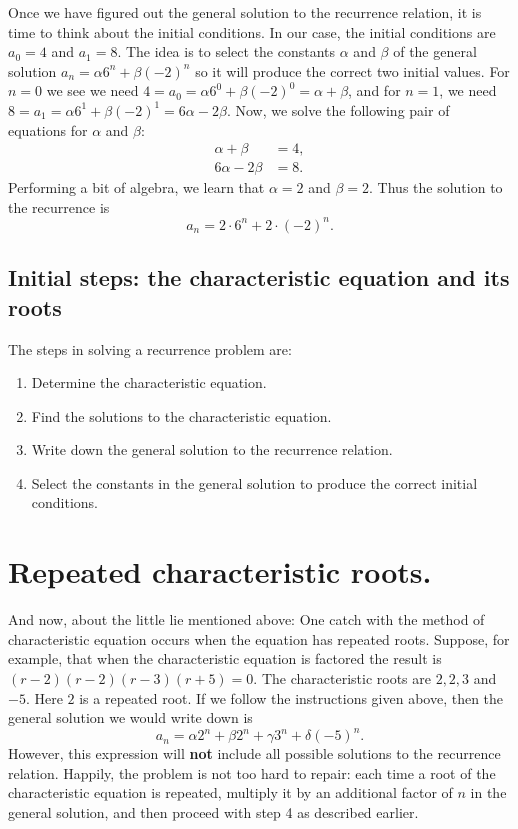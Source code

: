 Once we have figured out the general solution to the recurrence
relation, it is time to think about the initial conditions.  In our
case, the initial conditions are $a_0=4$  and $a_1=8$.  The idea is to
select the constants $\alpha$ and $\beta$ of the general solution
$a_n=\alpha 6^n+\beta (-2)^n$ so it will produce the correct two initial values.
For $n=0$ we see we need $4=a_0=\alpha 6^0+\beta (-2)^0 = \alpha+\beta$, and for
$n=1$, we need $8=a_1=\alpha 6^1+\beta (-2)^1 = 6\alpha-2\beta$. Now, we solve the 
following pair of equations for $\alpha$ and $\beta$:
\begin{align*}
  \alpha +  \beta &=4, \\
 6\alpha - 2\beta &=8.
\end{align*}
Performing a bit of algebra, we learn that $\alpha=2$ and
$\beta=2$.  Thus the solution to the recurrence is
\[
a_n=2\cdot6^n+2\cdot(-2)^n.
\]

\subsection{Initial steps: the characteristic equation and its roots}
The steps in solving a recurrence problem are:
\begin{enumerate}
 \item Determine the characteristic equation.
 \item Find the solutions to the characteristic equation.
 \item Write down the general solution to the recurrence relation.
 \item Select the constants in the general solution to produce the correct
 initial conditions.
\end{enumerate}


\section{Repeated characteristic roots.}\label{sect:repeated roots}
And now, about the little lie mentioned above: One catch with the method of
characteristic equation occurs when the equation has repeated roots. Suppose, for
example, that when the characteristic equation is factored the result is
$(r-2)(r-2)(r-3)(r+5)=0$.  The characteristic roots are $2,2,3$ and
$-5$. Here $2$ is a repeated root.  If we follow the instructions 
given above, then the general solution we would write down is
\begin{equation}\label{eqn:rep roots incorrect}
 a_n= \alpha 2^n+\beta 2^n+\gamma 3^n+\delta (-5)^n.
\end{equation}
However, this expression will {\bfseries not} include all possible solutions
to the recurrence relation. Happily, the problem is not too hard to
repair: each time a root of the characteristic equation is repeated,
multiply it by an additional factor of $n$ in the general solution, and
then proceed with step 4 as described earlier.

